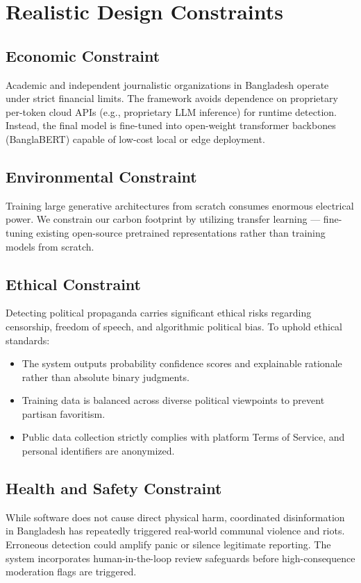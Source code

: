 \documentclass[12pt,a4paper]{report}
\begin{document}
\section{Realistic Design Constraints}

\subsection{Economic Constraint}
Academic and independent journalistic organizations in Bangladesh operate under
strict financial limits. The framework avoids dependence on proprietary per-token
cloud APIs (e.g., proprietary LLM inference) for runtime detection. Instead, the
final model is fine-tuned into open-weight transformer backbones (BanglaBERT)
capable of low-cost local or edge deployment.

\subsection{Environmental Constraint}
Training large generative architectures from scratch consumes enormous electrical
power. We constrain our carbon footprint by utilizing transfer learning ---
fine-tuning existing open-source pretrained representations rather than training
models from scratch.

\subsection{Ethical Constraint}
Detecting political propaganda carries significant ethical risks regarding
censorship, freedom of speech, and algorithmic political bias. To uphold ethical
standards:
\begin{itemize}
  \item The system outputs probability confidence scores and explainable rationale
        rather than absolute binary judgments.
  \item Training data is balanced across diverse political viewpoints to prevent
        partisan favoritism.
  \item Public data collection strictly complies with platform Terms of Service,
        and personal identifiers are anonymized.
\end{itemize}

\subsection{Health and Safety Constraint}
While software does not cause direct physical harm, coordinated disinformation in
Bangladesh has repeatedly triggered real-world communal violence and riots.
Erroneous detection could amplify panic or silence legitimate reporting. The system
incorporates human-in-the-loop review safeguards before high-consequence moderation
flags are triggered.
\end{document}
